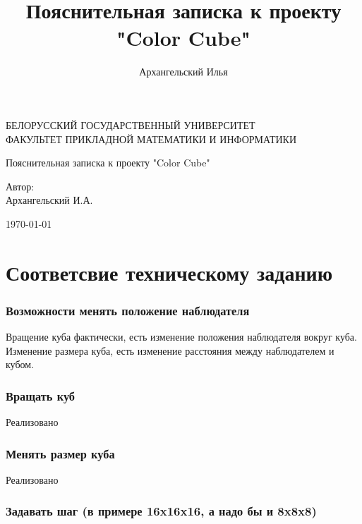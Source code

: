 \documentclass[a4paper,11pt]{article}
\title{Пояснительная записка к проекту "Color Cube"}
\author{Архангельский Илья}
\begin{document}
  \begin{titlepage}
   \begin{center}
		БЕЛОРУССКИЙ ГОСУДАРСТВЕННЫЙ УНИВЕРСИТЕТ \\
		ФАКУЛЬТЕТ ПРИКЛАДНОЙ МАТЕМАТИКИ И ИНФОРМАТИКИ
	\end{center}
	\vspace{10em}
	\begin{center}
		\LARGE {Пояснительная записка к проекту "Color Cube"}
		\linebreak	 
		
    
	\end{center}
	\vspace{3em}
	\begin{flushright}
	  
	
 	Автор: \\	Архангельский И.А. \\ 
 	
 	  \vspace{1em}
 	
 	  
 	
	\end{flushright}
	
	\vfill
	\begin{center}
		\today
	\end{center}
  \end{titlepage}
  \tableofcontents
  \newpage
  \part{Соответсвие техническому заданию}
   
  \section*{Возможности менять положение наблюдателя }
     
     Вращение куба фактически, есть изменение положения наблюдателя вокруг куба. Изменение размера куба, есть изменение расстояния между наблюдателем и кубом.
    \section*{Вращать куб  }
         
      Реализовано
   \section*{Менять размер куба }
        
      Реализовано 
    \section*{Задавать шаг (в примере 16x16x16, а надо бы и 8x8x8)}
         
\end{document}
